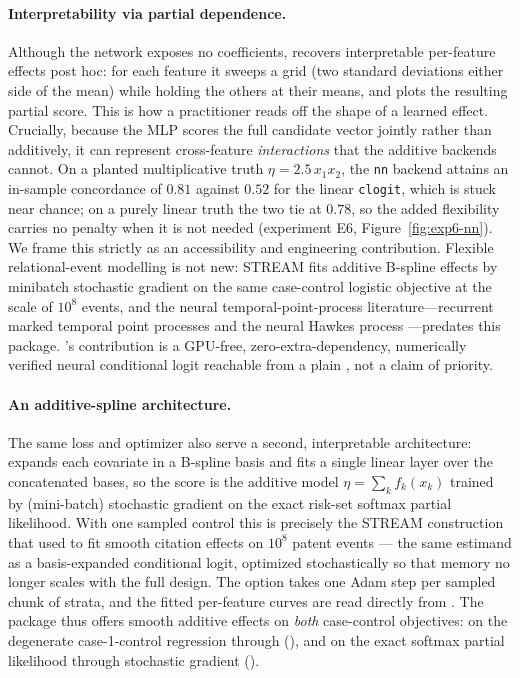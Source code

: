\paragraph{Interpretability via partial dependence.}
Although the network exposes no coefficients, 
recovers interpretable per-feature effects post hoc: for each feature it sweeps
a grid (two standard deviations either side of the mean) while holding the
others at their means, and plots the resulting partial score. This is how a
practitioner reads off the shape of a learned effect. Crucially, because the MLP
scores the full candidate vector jointly rather than additively, it can
represent cross-feature \emph{interactions} that the additive backends cannot.
On a planted multiplicative truth $\eta = 2.5\,x_1 x_2$, the \texttt{nn} backend
attains an in-sample concordance of $0.81$ against $0.52$ for the linear
\texttt{clogit}, which is stuck near chance; on a purely linear truth the two
tie at $0.78$, so the added flexibility carries no penalty when it is not needed
(experiment E6, Figure~\ref{fig:exp6-nn}). We frame this strictly as an
accessibility and engineering contribution. Flexible relational-event
modelling is not new: STREAM \citep{filippimazzola2024} fits additive
B-spline effects by minibatch stochastic gradient on the same case-control
logistic objective at the scale of $10^{8}$ events, and the neural
temporal-point-process literature---recurrent marked temporal point processes
\citep{du2016} and the neural Hawkes process \citep{mei2017}---predates this
package. 's contribution is a GPU-free, zero-extra-dependency,
numerically verified neural conditional logit reachable from a plain
, not a claim of priority.

\paragraph{An additive-spline architecture.}\label{sec:framework-nn-additive}
The same loss and optimizer also serve a second, interpretable architecture:
 expands each covariate
in a B-spline basis and fits a single linear layer over the concatenated
bases, so the score is the additive model $\eta = \sum_k f_k(x_k)$ trained by
(mini-batch) stochastic gradient on the exact risk-set softmax partial
likelihood. With one sampled control this is precisely the STREAM
construction that \citet{filippimazzola2024} used to fit smooth citation
effects on $10^{8}$ patent events --- the same estimand as a basis-expanded
conditional logit, optimized stochastically so that memory no longer scales
with the full design. The  option takes one Adam step per
sampled chunk of strata, and the fitted per-feature curves are read directly
from . The package thus offers smooth additive
effects on \emph{both} case-control objectives: on the degenerate
case-1-control regression through  (), and on
the exact softmax partial likelihood through stochastic gradient
().

